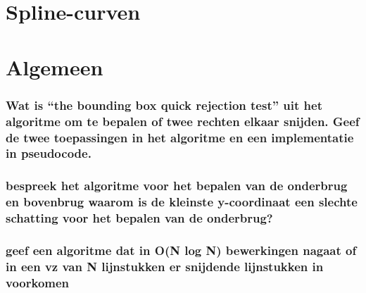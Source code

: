 \documentclass[12pt,a4paper]{article}
\begin{document}
\part{Spline-curven}
\iffalse
\section{Bewijs de eenheidspartitieeigenschap van genormaliseerde B-splines.}
\section{Hoe kan men bij splinecurven punten laten interpoleren door het samennemen van controlepunten? Hoeveel moeten er samenvallen? }
\section{Hoe kan men bij splines punten laten interpoleren door het samennemen van knooppunten?}
\section{Geef het algoritm van de Boor en bewijs de correctheid ervan.}
\section{Hoe kan je ervoor zorgen dat een deel van een spline curve een recht lijnstuk is?}
\fi

\part{Algemeen}
\iffalse
\section{Wat is ``the bounding box quick rejection test'' uit het algoritme om te bepalen of twee rechten elkaar snijden. Geef de twee toepassingen in het algoritme en een implementatie in pseudocode.}
\section{bespreek het algoritme voor het bepalen van de onderbrug en bovenbrug waarom is de kleinste y-coordinaat een slechte schatting voor het bepalen van de onderbrug?}
\section{geef een algoritme dat in O(N log N) bewerkingen nagaat of in een vz van N lijnstukken er snijdende lijnstukken in voorkomen}
\end{document}
